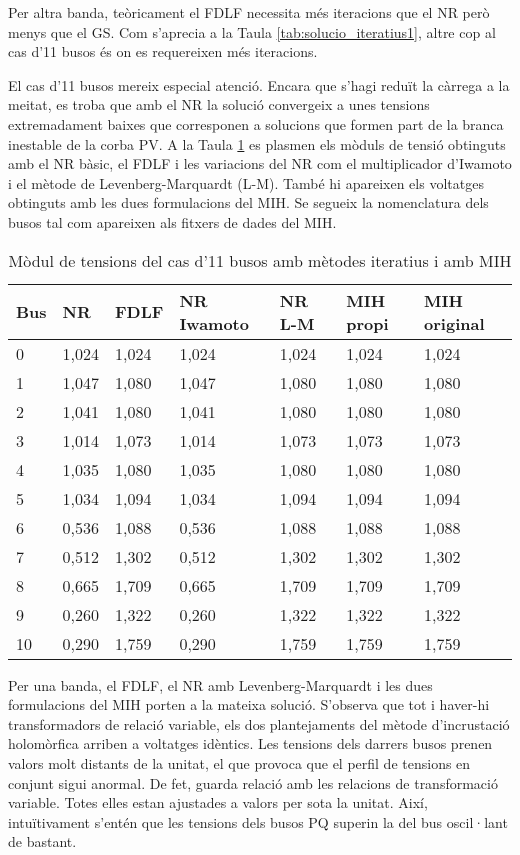 Per altra banda, teòricament el FDLF necessita més iteracions que el NR però menys que el GS. Com s'aprecia a la Taula \ref{tab:solucio_iteratius1}, altre cop al cas d'11 busos és on es requereixen més iteracions. 

El cas d'11 busos mereix especial atenció. Encara que s'hagi reduït la càrrega a la meitat, es troba que amb el NR la solució convergeix a unes tensions extremadament baixes que corresponen a solucions que formen part de la branca inestable de la corba PV. A la Taula \ref{tab:modulcas11} es plasmen els mòduls de tensió obtinguts amb el NR bàsic, el FDLF i les variacions del NR com el multiplicador d'Iwamoto i el mètode de Levenberg-Marquardt (L-M). També hi apareixen els voltatges obtinguts amb les dues formulacions del MIH. Se segueix la nomenclatura dels busos tal com apareixen als fitxers de dades del MIH.

\begin{table}[!htb]
  \begin{center}
  \begin{tabular}{lllllll}
  \hline
  Bus & NR & FDLF & NR Iwamoto & NR L-M & MIH propi & MIH original\\
  \hline
  \hline
  0 & 1,024 & 1,024& 1,024 & 1,024 & 1,024 & 1,024\\
  1 & 1,047 & 1,080 & 1,047 & 1,080 & 1,080 & 1,080\\
  2 & 1,041 & 1,080& 1,041 & 1,080 & 1,080 & 1,080\\
  3 & 1,014 & 1,073 & 1,014 & 1,073& 1,073 & 1,073\\
  4 & 1,035 & 1,080& 1,035 & 1,080& 1,080 & 1,080\\
  5 & 1,034 & 1,094 & 1,034 &1,094 & 1,094 & 1,094\\
  6 & 0,536 & 1,088 & 0,536 &1,088 & 1,088 & 1,088\\
  7 & 0,512 & 1,302 & 0,512 & 1,302& 1,302 & 1,302\\
  8 & 0,665 & 1,709 & 0,665 &1,709 & 1,709 & 1,709\\
  9 & 0,260 & 1,322 & 0,260 &1,322 & 1,322 & 1,322\\
  10 & 0,290 & 1,759 &0,290 &1,759 & 1,759&1,759 \\
  \hline 
  \end{tabular}
  \caption{Mòdul de tensions del cas d'11 busos amb mètodes iteratius i amb MIH}
  \label{tab:modulcas11}
  \end{center}
\end{table}

Per una banda, el FDLF, el NR amb Levenberg-Marquardt i les dues formulacions del MIH porten a la mateixa solució. S'observa que tot i haver-hi transformadors de relació variable, els dos plantejaments del mètode d'incrustació holomòrfica arriben a voltatges idèntics. Les tensions dels darrers busos prenen valors molt distants de la unitat, el que provoca que el perfil de tensions en conjunt sigui anormal. De fet, guarda relació amb les relacions de transformació variable. Totes elles estan ajustades a valors per sota la unitat. Així, intuïtivament s'entén que les tensions dels busos PQ superin la del bus oscil·lant de bastant. 

